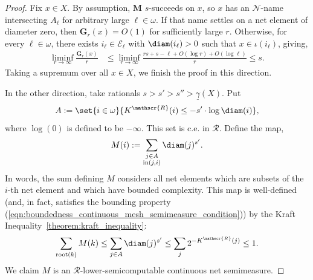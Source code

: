 \begin{proof}
    Fix $x \in X$. By assumption, $\mathbf{M}$ $s$-succeeds on $x$, so $x$ has an $\mathcal{N}$-name intersecting $A_\ell$ for arbitrary large $\ell \in \omega$. If that name settles on a net element of diameter zero, then $\mathbf{G}_r(x) = O(1)$ for sufficiently large $r$. Otherwise, for every $\ell \in \omega$, there exists $i_\ell \in \mathcal{E}_\ell$ with $\diam(i_\ell) > 0$ such that $x \in \iota(i_\ell)$, giving,
    \begin{align*}
        \liminf_{r \to \infty} \frac{\mathbf{G}_r(x)}{r} &\leq \liminf_{r \to \infty} \frac{rs + s - \ell + O(\log r) + O(\log \ell)}{r} \leq s.
    \end{align*}
    Taking a supremum over all $x \in X$, we finish the proof in this direction. 
    
 In the other direction, take rationals $s > s' > s'' > \underline{\gamma}(X)$. Put
    \begin{align*}
        A := \set{i \in \omega}{K^{\mathscr{R}}(i) \leq -s' \cdot \log \diam(i)},
    \end{align*}
    where $\log(0)$ is defined to be $-\infty$. This set is c.e. in $\mathscr{R}$. Define the map,
    \begin{align*}
        M(i) := \sum_{\substack{j \in A \\ \operatorname{in}(j, i)}} \diam(j)^{s'}.
    \end{align*}
    In words, the sum defining $M$ considers all net elements which are subsets of the $i$-th net element and which have bounded complexity. This map is well-defined (and, in fact, satisfies the bounding property (\ref{eqn:boundedness_continuous_mesh_semimeasure_condition})) by the Kraft Inequality~\ref{theorem:kraft_inequality}:
    \begin{align*}
        \sum_{\operatorname{root}(k)} M(k) \leq \sum_{j \in A} \diam(j)^{s'} \leq \sum_j 2^{-K^{\mathscr{R}}(j)} \leq 1.
    \end{align*}
    We claim  $M$ is an $\mathscr{R}$-lower-semicomputable continuous net semimeasure. 
    

\end{proof}
